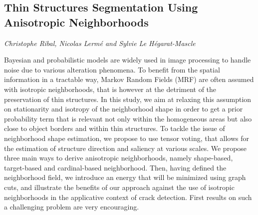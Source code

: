 \documentclass[../booklet.tex]{subfiles}
\begin{document}
\subsection[Thin Structures Segmentation Using Anisotropic Neighborhoods. {\it Christophe Ribal, Nicolas Lermé and Sylvie Le Hégarat-Mascle}]{Thin Structures Segmentation Using Anisotropic Neighborhoods}
  

\begin{center}
  {\it Christophe Ribal, Nicolas Lermé and Sylvie Le Hégarat-Mascle}
\end{center}

\vskip 0.8cm

Bayesian and probabilistic models are widely used in image processing to handle noise due to various alteration phenomena. To benefit from the spatial information in a tractable way, Markov Random Fields (MRF) are often assumed with isotropic neighborhoods, that is however at the
detriment of the preservation of thin structures. In this study, we aim at relaxing this assumption on stationarity and isotropy of the neighborhood shape in order to get a prior probability term that is relevant not only within the homogeneous areas but also close to object borders and within thin structures. To tackle the issue of neighborhood shape estimation, we propose to use tensor voting, that allows for the estimation of structure direction and saliency at various scales. We propose three main ways to derive anisotropic neighborhoods, namely shape-based, target-based and cardinal-based neighborhood. Then, having defined the neighborhood field, we introduce an
energy that will be minimized using graph cuts, and illustrate the benefits of our approach against the use of isotropic neighborhoods in the applicative context of crack detection. First results on such a challenging problem are very encouraging.

\end{document}
